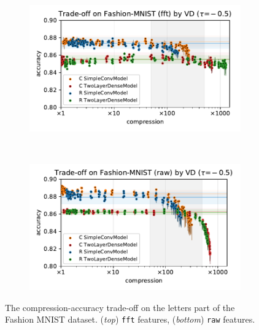 \documentclass[a4paper,10pt]{article}
\begin{document}
\begin{figure}[!h]
  \centering
  \begin{subfigure}[b]{1.\textwidth}  %
    \centering
    \includegraphics[width=\linewidth]{../assets/figure__mnist-like__trade-off/legacy__VD__fashionmnist__fft__-0.5.pdf}
  \end{subfigure} \\%
  \begin{subfigure}[b]{1.\textwidth}  %
    \centering
    \includegraphics[width=\linewidth]{../assets/figure__mnist-like__trade-off/legacy__VD__fashionmnist__raw__-0.5.pdf}
  \end{subfigure}
  \caption{%
    The compression-accuracy trade-off on the letters part of the Fashion MNIST dataset.
    (\textit{top}) \texttt{fft} features, (\textit{bottom}) \texttt{raw} features.
  }
  \label{fig:mnist-like__trade-off__fashionmnist}
\end{figure}
\end{document}
